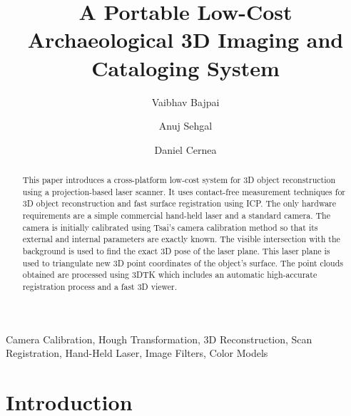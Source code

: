 \documentclass[english]{llncs}
\newenvironment{keywords}{
       \list{}{\advance\topsep by0.35cm\relax\small
       \leftmargin=1cm
       \labelwidth=0.35cm
       \listparindent=0.35cm
       \itemindent\listparindent
       \rightmargin\leftmargin}
			 \item[\hskip\labelsep\bfseries Keywords:]}
     {\endlist}
\begin{document}
\frontmatter 
	\pagestyle{headings} 
\mainmatter 

\title{A Portable Low-Cost Archaeological 3D Imaging and Cataloging System}

\author{Vaibhav Bajpai\and Anuj Sehgal\and Daniel Cernea}



\maketitle

\begin{abstract}

This paper introduces a cross-platform low-cost system for 3D object reconstruction using a projection-based laser scanner. It uses contact-free measurement techniques for 3D object reconstruction and fast surface registration using \ac{ICP}. The only hardware requirements are a simple commercial hand-held laser and a standard camera. The camera is initially calibrated using Tsai's camera calibration method so that its external and internal parameters are exactly known. The visible intersection with the background is used to find the exact 3D pose of the laser plane. This laser plane is used to triangulate new 3D point coordinates of the object’s surface. The point clouds obtained are processed using \ac{3DTK} which includes an automatic high-accurate registration process and a fast 3D viewer.

\end{abstract}

\begin{keywords}
	Camera Calibration, Hough Transformation, 
	3D Reconstruction, Scan Registration, 
	Hand-Held Laser, Image Filters, Color Models
\end{keywords}

\section{Introduction}
\label{section:introduction}

\end{document}
